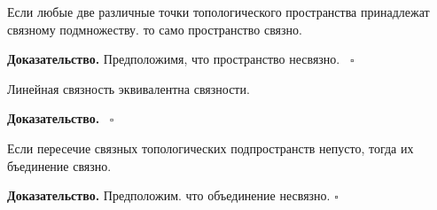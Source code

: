 \begin{theor}
Если любые две различные точки топологического пространства принадлежат
связному подмножеству. то само пространство связно.
\end{theor}
\textbf{Доказательство.} Предположимя, что пространство несвязно.  \
$\square$ 
\begin{theor}
Линейная связность эквивалентна связности.
\end{theor}
\textbf{Доказательство.}  \
$\square$ 
\begin{theor}
Если пересечие связных топологических подпространств непусто, тогда их 
бъединение связно.
\end{theor}
\textbf{Доказательство.} Предположим. что объединение несвязно. 
$\square$ 






